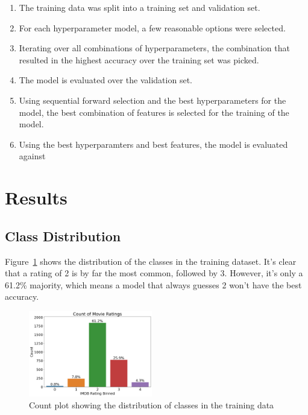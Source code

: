\documentclass[11pt]{article}
\begin{document}
\begin{enumerate}
    \item The training data was split into a training set and validation set.
    \item For each hyperparameter model, a few reasonable options were selected.
    \item Iterating over all combinations of hyperparameters, the combination that resulted in the highest accuracy over the training set was picked.
    \item The model is evaluated over the validation set.
    \item Using sequential forward selection and the best hyperparameters for the model, the best combination of features is selected for the training of the model. 
    \item Using the best hyperparamters and best features, the model is evaluated against 

\end{enumerate}



\section{Results}

\subsection{Class Distribution}
Figure~\ref{fig:class-dist} shows the distribution of the classes in the training dataset. It's clear that a rating of 2 is by far the most common, followed by 3. However, it's only a 61.2\% majority, which means a model that always guesses 2 won't have the best accuracy.

\begin{figure}[!ht]
	\centering
	\includegraphics[width = 0.48\textwidth]{res/class-dist.png}
	\caption{Count plot showing the distribution of classes in the training data}
	\label{fig:class-dist}
\end{figure}
\end{document}
